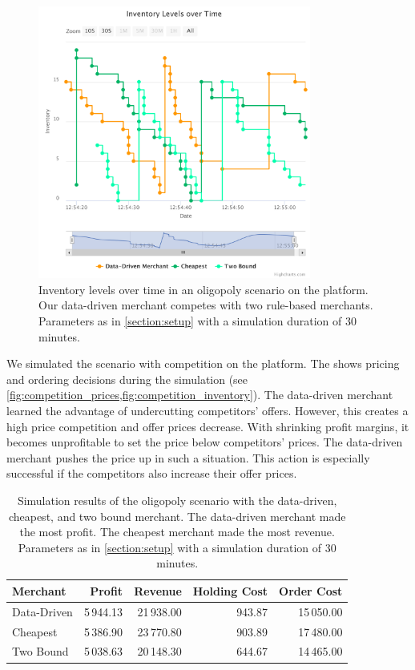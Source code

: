 \begin{figure}[t]
	\centering
	\includegraphics[width=0.8\textwidth]{figures/competition_inventory.pdf}
	\caption[Inventory Levels in Oligopoly Scenario]{Inventory levels over time in an oligopoly scenario on the \pricewars platform. Our data-driven merchant competes with two rule-based merchants. Parameters as in \cref{section:setup} with a simulation duration of 30 minutes.}
	\label{fig:competition_inventory}
\end{figure}

We simulated the scenario with competition on the \pricewars platform.
The \ui shows pricing and ordering decisions during the simulation (see \cref{fig:competition_prices,fig:competition_inventory}).
The data-driven merchant learned the advantage of undercutting competitors' offers.
However, this creates a high price competition and offer prices decrease.
With shrinking profit margins, it becomes unprofitable to set the price below competitors' prices.
The data-driven merchant pushes the price up in such a situation.
This action is especially successful if the competitors also increase their offer prices.

\begin{table}[t]
	\centering
	\begin{tabular}{lrrrr}
		\toprule
		\textbf{Merchant} & \textbf{Profit} & \textbf{Revenue} & \textbf{Holding Cost} & \textbf{Order Cost} \\
		\midrule
		Data-Driven & 5\,944.13 & 21\,938.00 & 943.87 & 15\,050.00 \\
		Cheapest & 5\,386.90 & 23\,770.80 & 903.89 & 17\,480.00 \\
		Two Bound & 5\,038.63 & 20\,148.30 & 644.67 & 14\,465.00 \\
		\bottomrule
	\end{tabular}
	\caption[Simulation Results of Oligopoly Scenario]{Simulation results of the oligopoly scenario with the data-driven, cheapest, and two bound merchant. The data-driven merchant made the most profit. The cheapest merchant made the most revenue. Parameters as in \cref{section:setup} with a simulation duration of 30 minutes.}
	\label{tab:competition}
\end{table}

